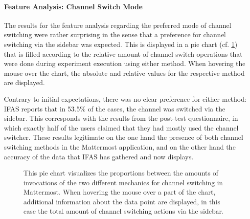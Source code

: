 \FloatBarrier

\paragraph{Feature Analysis: Channel Switch Mode} 

The results for the feature analysis regarding the preferred mode of channel switching were rather surprising in the sense that a preference for channel switching via the sidebar was expected.
This is displayed in a pie chart (cf. \cref{figure:evaluation:user:visualization-feature-analysis}) that is filled according to the relative amount of channel switch operations that were done during experiment execution using either method.
When hovering the mouse over the chart, the absolute and relative values for the respective method are displayed.

Contrary to initial expectations, there was no clear preference for either method: \ac{IFAS} reports that in 53.5\% of the cases, the channel was switched via the sidebar.
This corresponds with the results from the post-test questionnaire, in which exactly half of the users claimed that they had mostly used the channel switcher.
These results legitimate on the one hand the presence of both channel switching methods in the Mattermost application, and on the other hand the accuracy of the data that \ac{IFAS} has gathered and now displays.

\begin{figure}[t]
        \caption[Pie chart visualizing the proportions between channel switching actions.]{
        This pie chart visualizes the proportions between the amounts of invocations of the two different mechanics for channel switching in Mattermost.
        When hovering the mouse over a part of the chart, additional information about the data point are displayed, in this case the total amount of channel switching actions via the sidebar.}
        \label{figure:evaluation:user:visualization-feature-analysis}
\end{figure}

